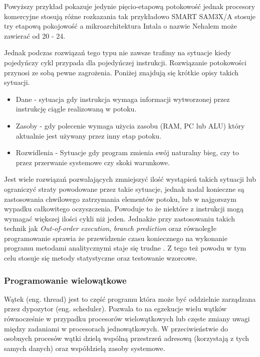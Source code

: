 \documentclass[a4paper,12pt]{article}
\begin{document}
Powyższy przykład pokazuje jedynie pięcio-etapową potokowość jednak procesory komercyjne stosują różne rozkazania tak przykładowo SMART SAM3X/A stosuje try etapową pokojowość\cite{datasheet} a mikroarchitektura Intala o nazwie Nehalem może zawierać od 20 - 24\cite{pipelining intel}.

Jednak podczas rozwiązań tego typu nie zawsze trafimy na sytuacje kiedy pojedyńczy cykl przypada dla pojedyńczej instrukcji. 
Rozwiązanie potokowości przynosi ze sobą pewne zagrożenia. Poniżej znajdują się krótkie opisy takich sytuacji. 

\begin{itemize}
        \item Dane - sytuacja gdy instrukcja wymaga informacji wytworzonej przez instrukcję ciągle realizowaną w potoku. 
        \item Zasoby - gdy polecenie wymaga użycia zasobu (RAM, PC lub ALU) który aktualnie jest używany przez inny etap potoku. 
        \item Rozwidlenia - Sytuacje gdy program zmienia swój naturalny bieg, czy to przez przerwanie systemowe czy skoki warunkowe. 
\end{itemize}

Jest wiele rozwiązań pozwalających zmniejszyć ilość wystąpień takich sytuacji lub ograniczyć straty powodowane przez takie sytuacje, jednak nadal konieczne są zastosowania chwilowego zatrzymania elementów potoku, lub w najgorszym wypadku całkowitego oczyszczenia.
Powoduje to że niektóre z instrukcji mogą wymagać większej ilości cykli niż jeden. Jednakże przy zastosowaniu takich technik jak
\textit{Out-of-order execution}, \textit{branch prediction} oraz równoległe programowanie sprawia że przewidzenie czasu koniecznego na wykonanie programu metodami analitycznymi staje się trudne . 
Z tego też powodu w tym celu stosuje się metody statystyczne oraz testowanie wzorcowe. 

\subsubsection{Programowanie wielowątkowe}

Wątek (eng. thread) jest to część programu która może być oddzielnie zarządzana przez dypozytor (eng. scheduler). 
Pozwala to na egzekucje wielu wątków równocześnie w przypadku procesorów wielowątkowych lub częste zmiany uwagi między zadaniami w procesorach jednowątkowych.
W przeciwieństwie do osobnych procesów wątki dzielą wspólną przestrzeń adresową (korzystają z tych samych danych) oraz współdzielą zasoby systemowe.
\end{document}
